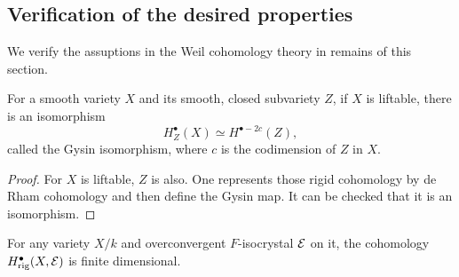 \subsection{Verification of the desired properties}
We verify the assuptions in the Weil cohomology theory in remains of this section. 
\begin{proposition}
    For a smooth variety $X$ and its smooth, closed subvariety $Z$, 
    if $X$ is liftable, there is an isomorphism
    \[
        H^\bullet_Z(X) \simeq H^{\bullet-2c}(Z),
    \]
    called the Gysin isomorphism, where $c$ is the codimension of $Z$ in $X$.
\end{proposition}

\begin{proof}
    For $X$ is liftable, $Z$ is also. 
    One represents those rigid cohomology by de Rham cohomology 
    and then define the Gysin map. 
    It can be checked that it is an isomorphism.
\end{proof}

\begin{theorem}
    For any variety $X / k$ and overconvergent $F$-isocrystal ${\mathcal {E}}$ on it, 
    the cohomology $H^\bullet_{\mathrm{rig}}(X, {\mathcal {E}})$ is finite dimensional.
\end{theorem}


